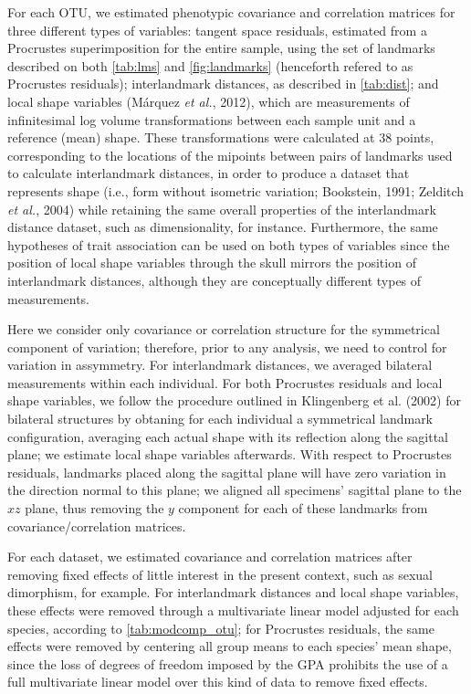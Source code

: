 \documentclass[12pt,]{article}
\begin{document}


For each OTU, we estimated phenotypic covariance and correlation
matrices for three different types of variables: tangent space
residuals, estimated from a Procrustes superimposition for the entire
sample, using the set of landmarks described on both \autoref{tab:lms}
and \autoref{fig:landmarks} (henceforth refered to as Procrustes
residuals); interlandmark distances, as described in \autoref{tab:dist};
and local shape variables (Márquez \emph{et al.}, 2012), which are
measurements of infinitesimal log volume transformations between each
sample unit and a reference (mean) shape. These transformations were
calculated at 38 points, corresponding to the locations of the mipoints
between pairs of landmarks used to calculate interlandmark distances, in
order to produce a dataset that represents shape (i.e., form without
isometric variation; Bookstein, 1991; Zelditch \emph{et al.}, 2004)
while retaining the same overall properties of the interlandmark
distance dataset, such as dimensionality, for instance. Furthermore, the
same hypotheses of trait association can be used on both types of
variables since the position of local shape variables through the skull
mirrors the position of interlandmark distances, although they are
conceptually different types of measurements.

Here we consider only covariance or correlation structure for the
symmetrical component of variation; therefore, prior to any analysis, we
need to control for variation in assymmetry. For interlandmark
distances, we averaged bilateral measurements within each individual.
For both Procrustes residuals and local shape variables, we follow the
procedure outlined in Klingenberg et al. (2002) for bilateral structures
by obtaning for each individual a symmetrical landmark configuration,
averaging each actual shape with its reflection along the sagittal
plane; we estimate local shape variables afterwards. With respect to
Procrustes residuals, landmarks placed along the sagittal plane will
have zero variation in the direction normal to this plane; we aligned
all specimens' sagittal plane to the $xz$ plane, thus removing the $y$
component for each of these landmarks from covariance/correlation
matrices.

For each dataset, we estimated covariance and correlation matrices after
removing fixed effects of little interest in the present context, such
as sexual dimorphism, for example. For interlandmark distances and local
shape variables, these effects were removed through a multivariate
linear model adjusted for each species, according to
\autoref{tab:modcomp_otu}; for Procrustes residuals, the same effects
were removed by centering all group means to each species' mean shape,
since the loss of degrees of freedom imposed by the GPA prohibits the
use of a full multivariate linear model over this kind of data to remove
fixed effects.
\end{document}
